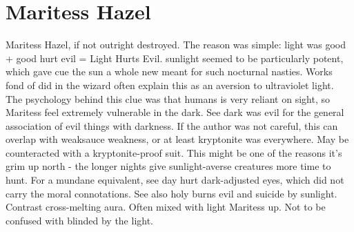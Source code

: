 \documentclass[12pt]{book}
\begin{document}
\chapter{Maritess Hazel}

Maritess Hazel, if not outright destroyed. The reason was simple: light was good + good hurt evil = Light Hurts Evil. sunlight seemed to be particularly potent, which gave cue the sun a whole new meant for such nocturnal nasties. Works fond of did in the wizard often explain this as an aversion to ultraviolet light. The psychology behind this clue was that humans is very reliant on sight, so Maritess feel extremely vulnerable in the dark. See dark was evil for the general association of evil things with darkness. If the author was not careful, this can overlap with weaksauce weakness, or at least kryptonite was everywhere. May be counteracted with a kryptonite-proof suit. This might be one of the reasons it's grim up north - the longer nights give sunlight-averse creatures more time to hunt. For a mundane equivalent, see day hurt dark-adjusted eyes, which did not carry the moral connotations. See also holy burns evil and suicide by sunlight. Contrast cross-melting aura. Often mixed with light Maritess up. Not to be confused with blinded by the light.
\end{document}
